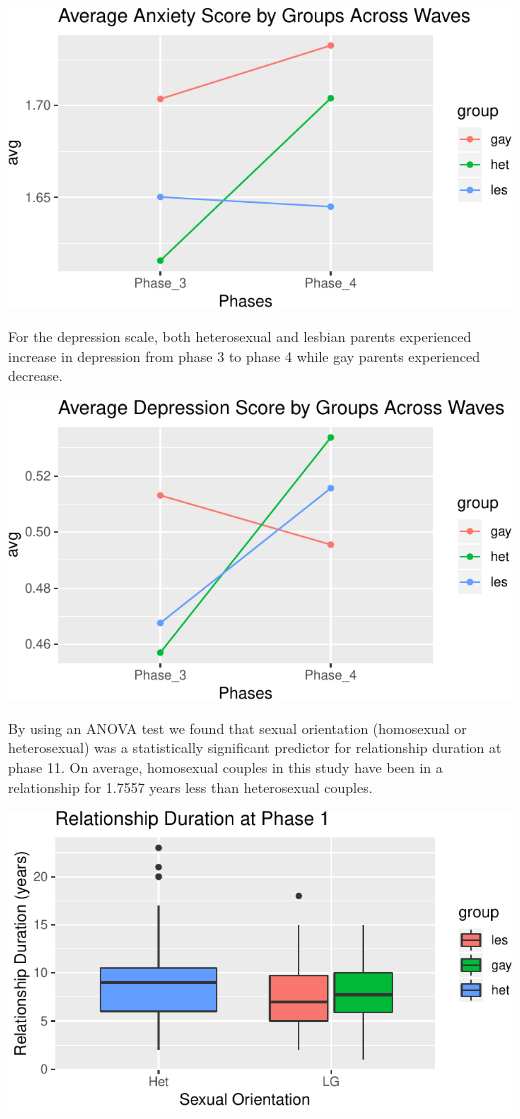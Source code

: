 \documentclass[man]{apa6}
\begin{document}
\includegraphics{measures_descriptive_stats_files/figure-latex/fig3-1.pdf}

For the depression scale, both heterosexual and lesbian parents experienced increase in depression from phase 3 to phase 4 while gay parents experienced decrease.

\includegraphics{measures_descriptive_stats_files/figure-latex/fig4-1.pdf}

By using an ANOVA test we found that sexual orientation (homosexual or heterosexual) was a statistically significant predictor for relationship duration at phase 11. On average, homosexual couples in this study have been in a relationship for 1.7557 years less than heterosexual couples.

\includegraphics{measures_descriptive_stats_files/figure-latex/fig5-1.pdf}
\end{document}
